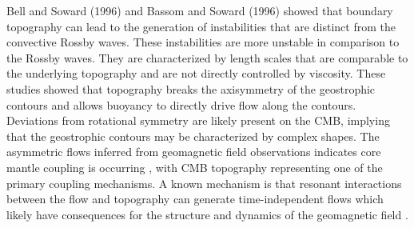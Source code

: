 Bell and Soward (1996) \citep{pB96} and Bassom and Soward (1996) \citep{aB96} showed that boundary topography can lead to the generation of instabilities that are distinct from the convective Rossby waves. These instabilities are more unstable in comparison to the Rossby waves. They are characterized by length scales that are comparable to the underlying topography and are not directly controlled by viscosity.
These studies showed that topography breaks the axisymmetry of the geostrophic contours and allows buoyancy to directly drive flow along the contours.
Deviations from rotational symmetry are likely present on the CMB, implying that the geostrophic contours may be characterized by complex shapes. The asymmetric flows inferred from geomagnetic field observations indicates core mantle coupling is occurring \citep{rH11,pL17,cF12,cF23}, with CMB topography representing one of the primary coupling mechanisms. 
A known mechanism is that resonant interactions between the flow and topography can generate time-independent flows which likely have consequences for the structure and dynamics of the geomagnetic field \citep{mC12}.






